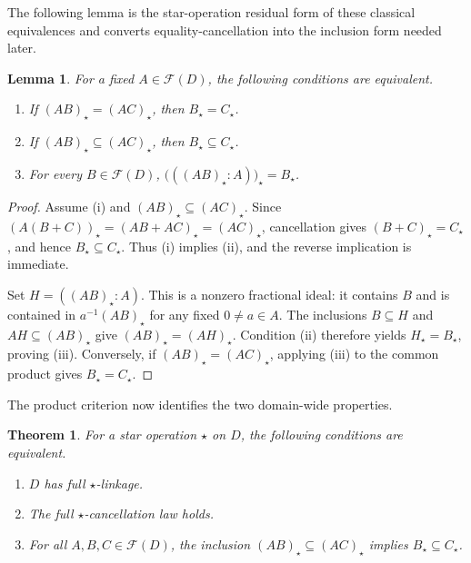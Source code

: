 \documentclass[11pt]{amsart}
\newtheorem{theorem}{Theorem}[section]
\newtheorem{lemma}[lemma]{Lemma}
\theoremstyle{definition}
\theoremstyle{remark}
\newcommand{\Fcal}{\mathcal F}
\begin{document}
The following lemma is the star-operation residual form of these classical
equivalences and converts equality-cancellation into the inclusion form
needed later.

\begin{lemma}\label{lem:residual}
For a fixed $A\in\Fcal(D)$, the following conditions are equivalent.
\begin{enumerate}[label=\textup{(\roman*)}]
\item If $(AB)_\star=(AC)_\star$, then $B_\star=C_\star$.
\item If $(AB)_\star\subseteq(AC)_\star$, then
      $B_\star\subseteq C_\star$.
\item For every $B\in\Fcal(D)$,
      $\bigl(( (AB)_\star:A)\bigr)_\star=B_\star$.
\end{enumerate}
\end{lemma}

\begin{proof}
Assume (i) and $(AB)_\star\subseteq(AC)_\star$.  Since
$(A(B+C))_\star=(AB+AC)_\star=(AC)_\star$, cancellation gives
$(B+C)_\star=C_\star$, and hence $B_\star\subseteq C_\star$.  Thus (i)
implies (ii), and the reverse implication is immediate.

Set $H=((AB)_\star:A)$.  This is a nonzero fractional ideal: it contains
$B$ and is contained in $a^{-1}(AB)_\star$ for any fixed $0\ne a\in A$.
The inclusions $B\subseteq H$ and
$AH\subseteq(AB)_\star$ give $(AB)_\star=(AH)_\star$.  Condition (ii)
therefore yields $H_\star=B_\star$, proving (iii).  Conversely, if
$(AB)_\star=(AC)_\star$, applying (iii) to the common product gives
$B_\star=C_\star$.
\end{proof}

The product criterion now identifies the two domain-wide properties.

\begin{theorem}\label{thm:linkage-cancellation}
For a star operation $\star$ on $D$, the following conditions are equivalent.
\begin{enumerate}[label=\textup{(\roman*)}]
\item $D$ has full $\star$-linkage.
\item The full $\star$-cancellation law holds.
\item For all $A,B,C\in\Fcal(D)$, the inclusion
      $(AB)_\star\subseteq(AC)_\star$ implies
      $B_\star\subseteq C_\star$.
\end{enumerate}
\end{theorem}
\end{document}
